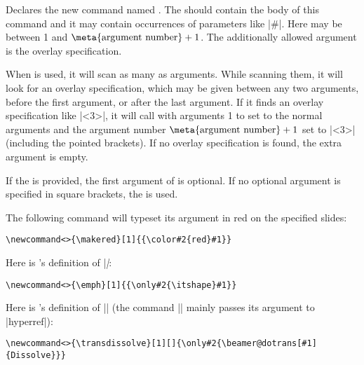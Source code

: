 \begin{command}{\newcommand\declare{|<>|}%
    }
  Declares the new command named . The 
  should contain the body of this command and it may contain
  occurrences of parameters like |#|. Here 
  may be between 1 and $\mbox{\meta{argument number}}+1$. The
  additionally allowed argument is the overlay specification.

  When  is used, it will scan as many as
   arguments. While scanning them, it will look
  for an overlay specification, which may be given between any two
  arguments, before the first argument, or after the last argument. If
  it finds an overlay specification like |<3>|, it will call
   with arguments 1 to  set to the
  normal arguments and the argument number $\mbox{\meta{argument
      number}}+1$ set to |<3>| (including the pointed brackets). If no
  overlay specification is found, the extra argument is empty.

  If the  is provided, the first argument
  of  is optional. If no optional argument is
  specified in square brackets, the  is
  used.

  \example The following command will typeset its argument in red on
  the specified slides:
\begin{verbatim}
\newcommand<>{\makered}[1]{{\color#2{red}#1}}
\end{verbatim}

  \example Here is \beamer's definition of |\emph|:
\begin{verbatim}
\newcommand<>{\emph}[1]{{\only#2{\itshape}#1}}
\end{verbatim}


  \example Here is \beamer's definition of |\transdissolve| (the
  command |\beamer@dotrans| mainly passes its argument to |hyperref|):
\begin{verbatim}
\newcommand<>{\transdissolve}[1][]{\only#2{\beamer@dotrans[#1]{Dissolve}}}
\end{verbatim}
\end{command}



